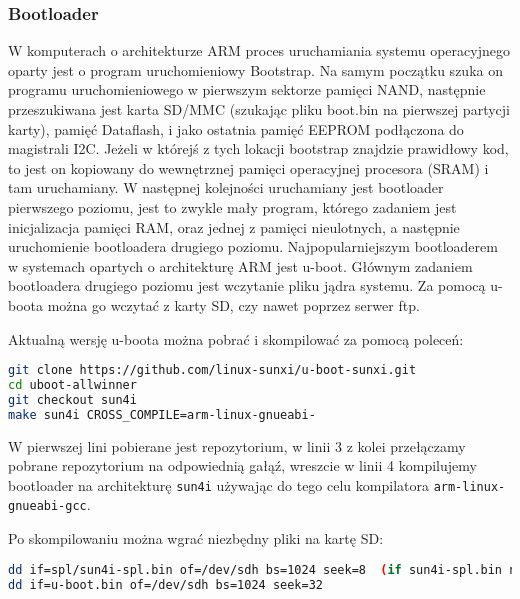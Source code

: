 \subsubsection{Bootloader}

W komputerach o architekturze ARM proces uruchamiania systemu operacyjnego oparty jest o program uruchomieniowy Bootstrap. Na samym początku szuka on programu uruchomieniowego w pierwszym sektorze pamięci NAND, następnie przeszukiwana jest karta SD/MMC (szukając pliku boot.bin na pierwszej partycji karty), pamięć Dataflash, i jako ostatnia pamięć EEPROM podłączona do magistrali I2C. Jeżeli w którejś z tych lokacji bootstrap znajdzie prawidłowy kod, to jest on kopiowany do wewnętrznej pamięci operacyjnej procesora (SRAM) i tam uruchamiany. W następnej kolejności uruchamiany jest bootloader pierwszego poziomu, jest to zwykle mały program, którego zadaniem jest inicjalizacja pamięci RAM, oraz jednej z pamięci nieulotnych, a następnie uruchomienie bootloadera drugiego poziomu.
Najpopularniejszym bootloaderem w systemach opartych o architekturę ARM jest u-boot. Głównym zadaniem bootloadera drugiego poziomu jest wczytanie pliku jądra systemu. Za pomocą u-boota można go wczytać z karty SD, czy nawet poprzez serwer ftp.

\par

Aktualną wersję u-boota można pobrać i skompilować za pomocą poleceń:

\begin{lstlisting}[language=bash]
git clone https://github.com/linux-sunxi/u-boot-sunxi.git
cd uboot-allwinner
git checkout sun4i
make sun4i CROSS_COMPILE=arm-linux-gnueabi-
\end{lstlisting}

\par

W pierwszej lini pobierane jest repozytorium, w linii 3 z kolei przełączamy pobrane repozytorium na odpowiednią gałąź, wreszcie w linii 4 kompilujemy bootloader na architekturę \lstinline{sun4i} używając do tego celu kompilatora \lstinline{arm-linux-gnueabi-gcc}.

Po skompilowaniu można wgrać niezbędny pliki na kartę SD:

\begin{lstlisting}[language=bash]
dd if=spl/sun4i-spl.bin of=/dev/sdh bs=1024 seek=8  (if sun4i-spl.bin not found, try sunxi-spl.bin)
dd if=u-boot.bin of=/dev/sdh bs=1024 seek=32
\end{lstlisting}

